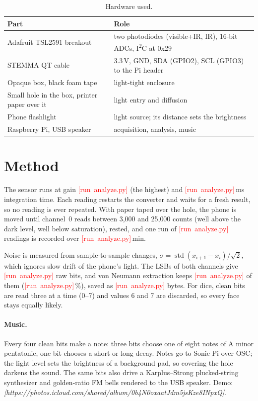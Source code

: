 \documentclass[11pt]{article}
\newcommand{\demoLink}{\textit{[https://photos.icloud.com/shared/album/0b4N0oxaatJdm5jsKze8INpxQ]}}
\newcommand{\pending}{\mbox{\textcolor{red}{[run analyze.py]}}}
\newcommand{\runGain}{\pending}\newcommand{\runAtime}{\pending}\newcommand{\runSamples}{\pending}
\newcommand{\runMinutes}{\pending}\newcommand{\runMean}{\pending}\newcommand{\runMeanIR}{\pending}
\newcommand{\runRawBits}{\pending}\newcommand{\runBits}{\pending}\newcommand{\runBytes}{\pending}
\newcommand{\runYield}{\pending}\newcommand{\runDice}{\pending}
\begin{document}
\begin{table}[h]
\centering\small
\begin{tabular}{@{}ll@{}}
\toprule
Part & Role \\
\midrule
Adafruit TSL2591 breakout & two photodiodes (visible+IR, IR), 16-bit ADCs, I\textsuperscript{2}C at 0x29 \\
STEMMA QT cable & 3.3\,V, GND, SDA (GPIO2), SCL (GPIO3) to the Pi header \\
Opaque box, black foam tape & light-tight enclosure \\
Small hole in the box, printer paper over it & light entry and diffusion \\
Phone flashlight & light source; its distance sets the brightness \\
Raspberry Pi, USB speaker & acquisition, analysis, music \\
\bottomrule
\end{tabular}
\caption{Hardware used.}
\end{table}

\section{Method}
The sensor runs at gain \runGain{} (the highest) and \runAtime\,ms integration time. Each reading restarts the
converter and waits for a fresh result, so no reading is ever repeated. With paper taped over the
hole, the phone is moved until channel~0 reads between 3{,}000 and 25{,}000 counts (well above the dark
level, well below saturation), rested, and one run of \runSamples{} readings is recorded over \runMinutes\,min.

Noise is measured from sample-to-sample changes, $\sigma=\operatorname{std}(x_{i+1}-x_i)/\sqrt2$, which
ignores slow drift of the phone's light. The LSBs of both channels give \runRawBits{} raw bits, and von
Neumann extraction keeps \runBits{} of them (\runYield\,\%), saved as \runBytes{} bytes. For dice, clean bits
are read three at a time (0--7) and values 6 and 7 are discarded, so every face stays equally likely.

\paragraph{Music.} Every four clean bits make a note: three bits choose one of eight notes of A minor
pentatonic, one bit chooses a short or long decay. Notes go to Sonic Pi over OSC; the light level sets the
brightness of a background pad, so covering the hole darkens the sound. The same bits also drive a
Karplus--Strong plucked-string synthesizer and golden-ratio FM bells rendered to the USB speaker.
Demo: \demoLink.
\end{document}
